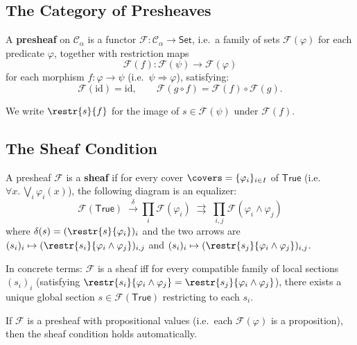 \subsection{The Category of Presheaves}

\begin{definition}
A \textbf{presheaf} on \(\mathcal{C}_\alpha\) is a functor
\(\mathcal{F} : \mathcal{C}_\alpha \to \mathsf{Set}\), i.e.\ a
family of sets \(\mathcal{F}(\varphi)\) for each predicate
\(\varphi\), together with restriction maps
\[
  \mathcal{F}(f) : \mathcal{F}(\psi) \to \mathcal{F}(\varphi)
\]
for each morphism \(f : \varphi \to \psi\) (i.e.\
\(\psi \Rightarrow \varphi\)), satisfying:
\[
  \mathcal{F}(\mathrm{id}) = \mathrm{id},
  \qquad
  \mathcal{F}(g \circ f) = \mathcal{F}(f) \circ \mathcal{F}(g).
\]
\end{definition}

We write \(\restr{s}{f}\) for the image of \(s \in \mathcal{F}(\psi)\)
under \(\mathcal{F}(f)\).

\subsection{The Sheaf Condition}

\begin{definition}
A presheaf \(\mathcal{F}\) is a \textbf{sheaf} if for every cover
\(\covers = \{\varphi_i\}_{i \in I}\) of \(\mathsf{True}\)
(i.e.\ \(\forall x.\,\bigvee_i \varphi_i(x)\)), the following
diagram is an equalizer:
\[
  \mathcal{F}(\mathsf{True}) \;\xrightarrow{\;\delta\;}
  \prod_i \mathcal{F}(\varphi_i) \;\rightrightarrows\;
  \prod_{i,j} \mathcal{F}(\varphi_i \wedge \varphi_j)
\]
where \(\delta(s) = (\restr{s}{\varphi_i})_i\) and the two arrows
are \((s_i)_i \mapsto (\restr{s_i}{\varphi_i \wedge \varphi_j})_{i,j}\)
and \((s_i)_i \mapsto (\restr{s_j}{\varphi_i \wedge \varphi_j})_{i,j}\).
\end{definition}

In concrete terms: \(\mathcal{F}\) is a sheaf iff for every compatible
family of local sections \((s_i)_i\) (satisfying
\(\restr{s_i}{\varphi_i \wedge \varphi_j} = \restr{s_j}{\varphi_i
\wedge \varphi_j}\)), there exists a unique global section
\(s \in \mathcal{F}(\mathsf{True})\) restricting to each \(s_i\).

\begin{lemma}
\label{lem:prop-sheaf-trivial}
If \(\mathcal{F}\) is a presheaf with propositional values
(i.e.\ each \(\mathcal{F}(\varphi)\) is a proposition), then the
sheaf condition holds automatically.
\end{lemma}

